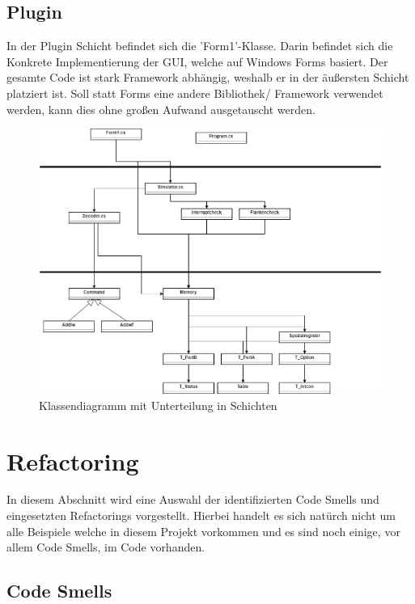 \documentclass[12pt,a4paper,titlepage,ngerman,pdftex]{report}
\begin{document}
	\subsection{Plugin}
	In der Plugin Schicht befindet sich die 'Form1'-Klasse. Darin befindet sich die Konkrete Implementierung der GUI, welche auf Windows Forms basiert. Der gesamte Code ist stark Framework abhängig, weshalb er in der äußersten Schicht platziert ist.
	Soll statt Forms eine andere Bibliothek/ Framework verwendet werden, kann dies ohne großen Aufwand ausgetauscht werden.
	
	\begin{figure}
		\centering
		\includegraphics[width = \linewidth]{"images/classdiagramm.png"}
		\caption{Klassendiagramm mit Unterteilung in Schichten}
	\end{figure}
	
	\section{Refactoring}\label{sec:refactoring}
	
	
	In diesem Abschnitt wird eine Auswahl der identifizierten Code Smells und eingesetzten Refactorings vorgestellt. Hierbei handelt es sich natürch nicht um alle Beispiele welche in diesem Projekt vorkommen und es sind noch einige, vor allem Code Smells, im Code vorhanden. 
	
	\subsection{Code Smells}
	
\end{document}
